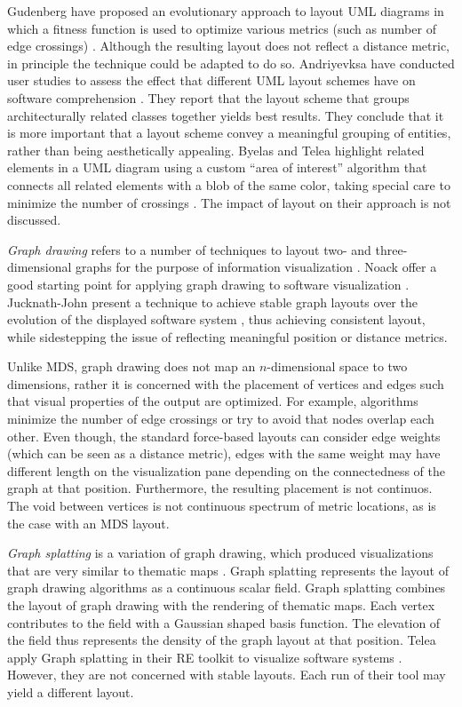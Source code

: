 Gudenberg \etal have proposed an evolutionary approach to layout UML diagrams in which a fitness function is used to optimize various metrics (such as number of edge crossings) \cite{Gude06a}. Although the resulting layout does not reflect a distance metric, in principle the technique could be adapted to do so. Andriyevksa \etal have conducted user studies to assess the effect that different UML layout schemes have on software comprehension \cite{Andr05a}.
They report that the layout scheme that groups architecturally related classes together yields best results. They conclude that it is more important that a layout scheme convey %
a meaningful grouping of entities, rather than being aesthetically appealing. Byelas and Telea highlight related elements in a UML
diagram using a custom ``area of interest'' algorithm that connects all related elements with a blob of the same color, taking special care to minimize the number of crossings \cite{Byel06a}.
The impact of layout on their approach is not discussed.

\emph{Graph drawing} refers to a number of techniques to layout two- and three-dimensional graphs for the purpose of information visualization \cite{Ware04a,Kauf01b}. Noack \etal offer a good starting point for applying graph drawing to software visualization \cite{Noac05a}. Jucknath-John \etal present a technique to achieve stable graph layouts over the evolution of the displayed software system \cite{Juck06a}, thus achieving consistent layout, while sidestepping the issue of reflecting meaningful position or distance metrics.

Unlike MDS, graph drawing does not map an $n$-dimensional space to two dimensions, rather it is concerned with the placement of vertices and edges such that visual properties of the output are optimized. For example, algorithms minimize the number of edge crossings or try to avoid that nodes overlap each other. Even though, the standard force-based layouts can consider edge weights (which can be seen as a distance metric), edges with the same weight may have different length on the visualization pane depending on the connectedness of the graph at that position. Furthermore, the resulting placement is not continuos. The void between vertices is not continuous spectrum of metric locations, as is the case with an MDS layout.

\emph{Graph splatting} is a variation of graph drawing, which produced visualizations that are very similar to thematic maps \cite{Lier03a}. Graph splatting represents the layout of graph drawing algorithms as a continuous scalar field. Graph splatting combines the layout of graph drawing with the rendering of thematic maps. Each vertex contributes to the field with a Gaussian shaped basis function. The elevation of the field thus represents the density of the graph layout at that position. Telea \etal apply Graph splatting in their RE toolkit to visualize software systems \cite{Tele03a}. However, they are not concerned with stable layouts. Each run of their tool may yield a different layout.

